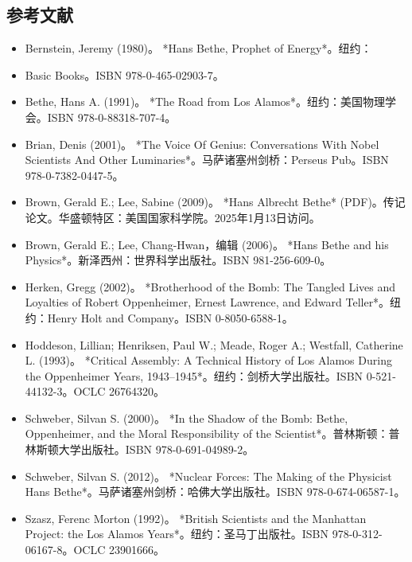 \subsection{参考文献}  
\begin{itemize}
\item Bernstein, Jeremy (1980)。 *Hans Bethe, Prophet of Energy*。纽约：\item Basic Books。ISBN 978-0-465-02903-7。  
\item Bethe, Hans A. (1991)。 *The Road from Los Alamos*。纽约：美国物理学会。ISBN 978-0-88318-707-4。  
\item Brian, Denis (2001)。 *The Voice Of Genius: Conversations With Nobel Scientists And Other Luminaries*。马萨诸塞州剑桥：Perseus Pub。ISBN 978-0-7382-0447-5。  
\item Brown, Gerald E.; Lee, Sabine (2009)。 *Hans Albrecht Bethe* (PDF)。传记论文。华盛顿特区：美国国家科学院。2025年1月13日访问。  
\item Brown, Gerald E.; Lee, Chang-Hwan，编辑 (2006)。 *Hans Bethe and his Physics*。新泽西州：世界科学出版社。ISBN 981-256-609-0。  
\item Herken, Gregg (2002)。 *Brotherhood of the Bomb: The Tangled Lives and Loyalties of Robert Oppenheimer, Ernest Lawrence, and Edward Teller*。纽约：Henry Holt and Company。ISBN 0-8050-6588-1。  
\item Hoddeson, Lillian; Henriksen, Paul W.; Meade, Roger A.; Westfall, Catherine L. (1993)。 *Critical Assembly: A Technical History of Los Alamos During the Oppenheimer Years, 1943–1945*。纽约：剑桥大学出版社。ISBN 0-521-44132-3。OCLC 26764320。  
\item Schweber, Silvan S. (2000)。 *In the Shadow of the Bomb: Bethe, Oppenheimer, and the Moral Responsibility of the Scientist*。普林斯顿：普林斯顿大学出版社。ISBN 978-0-691-04989-2。  
\item Schweber, Silvan S. (2012)。 *Nuclear Forces: The Making of the Physicist Hans Bethe*。马萨诸塞州剑桥：哈佛大学出版社。ISBN 978-0-674-06587-1。  
\item Szasz, Ferenc Morton (1992)。 *British Scientists and the Manhattan Project: the Los Alamos Years*。纽约：圣马丁出版社。ISBN 978-0-312-06167-8。OCLC 23901666。
\end{itemize}
